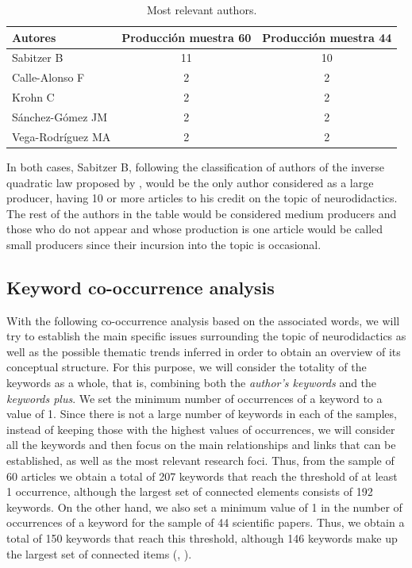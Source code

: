 \documentclass[english]{textolivre}
\begin{document}
\begin{table}[h!]
\centering
\caption{Most relevant authors.}\label{Table03}
\begin{tabular}{lcc}
\toprule
Autores & Producción muestra 60 & Producción muestra 44 \\
\hline
Sabitzer B & 11 & 10 \\
Calle-Alonso F & 2 & 2 \\
Krohn C & 2 & 2 \\
Sánchez-Gómez JM & 2 & 2 \\
Vega-Rodríguez MA & 2 & 2 \\
\hline
\end{tabular}
\end{table}

In both cases, Sabitzer B, following the classification of authors of the inverse quadratic law proposed by \textcite{lotka_frequency_1926}, would be the only author considered as a large producer, having 10 or more articles to his credit on the topic of neurodidactics. The rest of the authors in the table would be considered medium producers and those who do not appear and whose production is one article would be called small producers since their incursion into the topic is occasional.

\subsection{Keyword co-occurrence analysis}

With the following co-occurrence analysis based on the associated words, we will try to establish the main specific issues surrounding the topic of neurodidactics as well as the possible thematic trends inferred in order to obtain an overview of its conceptual structure. For this purpose, we will consider the totality of the keywords as a whole, that is, combining both the \textit{author's keywords} and the \textit{keywords plus}. We set the minimum number of occurrences of a keyword to a value of 1. Since there is not a large number of keywords in each of the samples, instead of keeping those with the highest values of occurrences, we will consider all the keywords and then focus on the main relationships and links that can be established, as well as the most relevant research foci. Thus, from the sample of 60 articles we obtain a total of 207 keywords that reach the threshold of at least 1 occurrence, although the largest set of connected elements consists of 192 keywords. On the other hand, we also set a minimum value of 1 in the number of occurrences of a keyword for the sample of 44 scientific papers. Thus, we obtain a total of 150 keywords that reach this threshold, although 146 keywords make up the largest set of connected items (, ).
\end{document}
